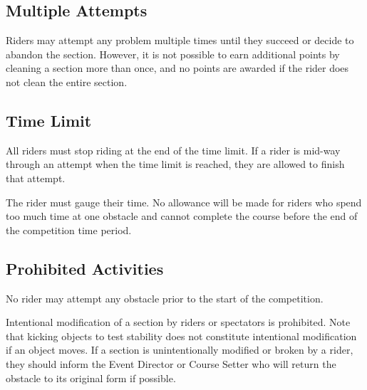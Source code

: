 \subsection{Multiple Attempts}
Riders may attempt any problem multiple times until they succeed or decide to abandon the section.
However, it is not possible to earn additional points by cleaning a section more than once, and no points are awarded if the rider does not clean the entire section.

\subsection{Time Limit}

All riders must stop riding at the end of the time limit. 
If a rider is mid-way through an attempt when the time limit is reached, they are allowed to finish that attempt.

The rider must gauge their time. 
No allowance will be made for riders who spend too much time at one obstacle and cannot complete the course before the end of the competition time period.

\subsection{Prohibited Activities}
No rider may attempt any obstacle prior to the start of the competition. 

Intentional modification of a section by riders or spectators is prohibited. 
Note that kicking objects to test stability does not constitute intentional modification if an object moves. 
If a section is unintentionally modified or broken by a rider, they should inform the Event Director or Course Setter who will return the obstacle to its original form if possible. %
